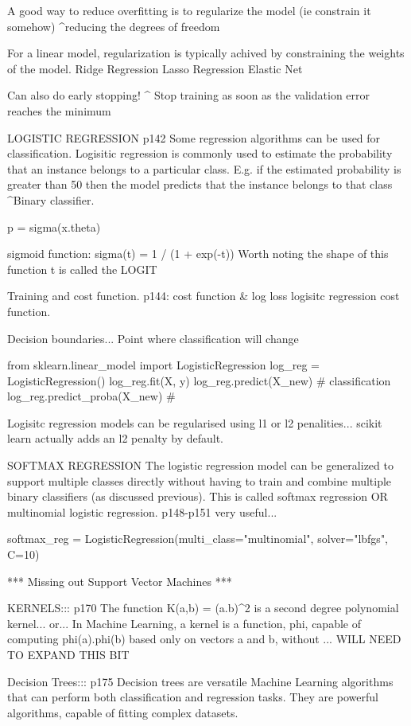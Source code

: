A good way to reduce overfitting is to regularize the model (ie constrain it somehow)
^reducing the degrees of freedom

For a linear model, regularization is typically achived by constraining the weights of the model.
Ridge Regression
Lasso Regression
Elastic Net

Can also do early stopping!
^ Stop training as soon as the validation error reaches the minimum

LOGISTIC REGRESSION p142
Some regression algorithms can be used for classification.
Logisitic regression is commonly used to estimate the probability that
an instance belongs to a particular class.
E.g. if the estimated probability is greater than 50%
then the model predicts that the instance belongs to that class
^Binary classifier.

p = sigma(x.theta)

sigmoid function:
sigma(t) = 1 / (1 + exp(-t))
Worth noting the shape of this function
t is called the LOGIT

Training and cost function.
p144: cost function & log loss logisitc regression cost function.

Decision boundaries...
Point where classification will change

from sklearn.linear_model import LogisticRegression
log_reg = LogisticRegression()
log_reg.fit(X, y)
log_reg.predict(X_new) # classification
log_reg.predict_proba(X_new) # 

Logisitc regression models can be regularised using l1 or l2 penalities...
scikit learn actually adds an l2 penalty by default.

SOFTMAX REGRESSION
The logistic regression model can be generalized to support multiple classes directly
without having to train and combine multiple binary classifiers (as discussed previous).
This is called softmax regression OR multinomial logistic regression.
p148-p151 very useful...

softmax_reg = LogisticRegression(multi_class="multinomial", solver="lbfgs", C=10)

*** Missing out Support Vector Machines ***

KERNELS:::
p170
The function K(a,b) = (a.b)^2
is a second degree polynomial kernel...
or...
In Machine Learning,
a kernel is a function, phi,
capable of computing phi(a).phi(b)
based only on vectors a and b,
without ...
WILL NEED TO EXPAND THIS BIT

Decision Trees::: p175
Decision trees are versatile Machine Learning algorithms
that can perform both classification and regression tasks.
They are powerful algorithms, capable of fitting complex datasets.

